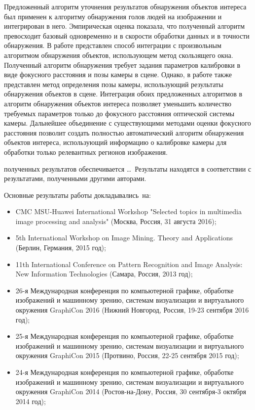 {\influence} Предложенный алгоритм уточнения результатов обнаружения объектов интереса был применен к алгоритму обнаружения голов людей на изображении и интегрирован в него. Эмпирическая оценка показала, что полученный алгоритм превосходит базовый одновременно и в скорости обработки данных и в точности обнаружения. В работе представлен способ интеграции с произвольным алгоритмом обнаружения объектов, использующем метод скользящего окна. Полученный алгоритм обнаружения требует задания параметров калибровки в виде фокусного расстояния и позы камеры в сцене. Однако, в работе также представлен метод определения позы камеры, использующий результаты обнаружения объектов в сцене. Интеграция обоих предложенных алгоритмов в алгоритм обнаружения объектов интереса позволяет уменьшить количество требуемых параметров только до фокусного расстояния оптической системы камеры. Дальнейшее объединение с существующими методами оценки фокусного расстояния позволит создать полностью автоматический алгоритм обнаружения объектов интереса, использующий информацию о калибровке камеры для обработки только релевантных регионов изображения.




{\reliability} полученных результатов обеспечивается \ldots \ Результаты находятся в соответствии с результатами, полученными другими авторами.


{\probation}
Основные результаты работы докладывались~на:
\begin{itemize}
	\item CMC MSU-Huawei International Workshop "Selected topics in multimedia image processing and analysis" (Москва, Россия, 31 августа 2016);
	\item 5th International Workshop on Image Mining. Theory and Applications (Берлин, Германия, 2015 год);
	\item 11th International Conference on Pattern Recognition and Image Analysis: New Information Technologies (Самара, Россия, 2013 год);
	\item 26-я Международная конференция по компьютерной графике, обработке изображений и машинному зрению, системам визуализации и виртуального окружения GraphiCon 2016 (Нижний Новгород, Россия, 19-23 сентября 2016 год);
	\item 25-я Международная конференция по компьютерной графике, обработке изображений и машинному зрению, системам визуализации и виртуального окружения GraphiCon 2015 (Протвино, Россия, 22-25 сентября 2015 год);	
	\item 24-я Международная конференция по компьютерной графике, обработке изображений и машинному зрению, системам визуализации и виртуального окружения GraphiCon 2014 (Ростов-на-Дону, Россия, 30 сентября-3 октября 2014 год);
\end{itemize}

